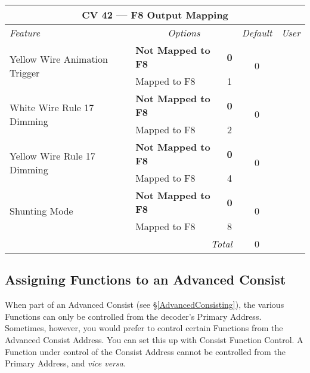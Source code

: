 \documentclass[12pt,letterpaper,draft]{memoir} %
\begin{document}
\label{CV42}
\begin{center}
\begin{tabular}{|l|lc|c|c|}
\hline
\multicolumn{5}{|c|}{\textbf{CV 42 --- F8 Output Mapping}} \\ \hline \hline
\textit{Feature} & \multicolumn{2}{c|}{\textit{Options}} & \textit{Default} & \textit{User} \\ \hline
\multirow{2}{*}{Yellow Wire Animation Trigger} & \textbf{Not Mapped to F8} & \textbf{0}	& 	\multirow{2}{*}{0}& \\
                           & Mapped to F8 & 1 & & \\ \hline
\multirow{2}{*}{White Wire Rule 17 Dimming} & \textbf{Not Mapped to F8} & \textbf{0}	& 	\multirow{2}{*}{0}& \\
                             & Mapped to F8 & 2 & & \\ \hline
\multirow{2}{*}{Yellow Wire Rule 17 Dimming} & \textbf{Not Mapped to F8} & \textbf{0}	& 	\multirow{2}{*}{0}&\\
                             & Mapped to F8 & 4 & & \\ \hline
\multirow{2}{*}{Shunting Mode} & \textbf{Not Mapped to F8} & \textbf{0}	& 	\multirow{2}{*}{0}&\\
                             & Mapped to F8 & 8 & & \\ \hline\hline
\multicolumn{3}{|r|}{\textit{Total}} & 0 &\\ \hline
\end{tabular}
\end{center}

\subsection{Assigning Functions to an Advanced Consist}
\label{LightingInConsist}
When part of an Advanced Consist (see \S\ref{AdvancedConsisting}), the various Functions can only be controlled from the decoder's Primary Address. Sometimes, however, you would prefer to control certain Functions from the Advanced Consist Address. You can set this up with Consist Function Control. A Function under control of the Consist Address cannot be controlled from the Primary Address, and \textit{vice versa}.
\end{document}
